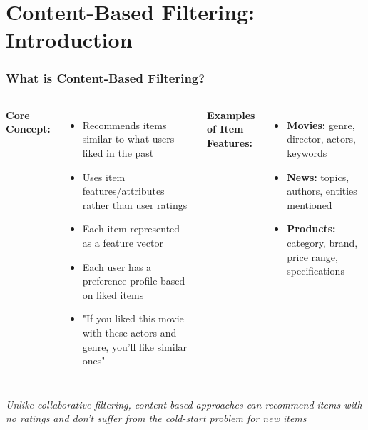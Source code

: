 \documentclass{beamer}
\begin{document}
\section{Content-Based Filtering: Introduction}
\begin{frame}
\frametitle{What is Content-Based Filtering?}

\begin{columns}
\textbf{Core Concept:}
\begin{itemize}
    \item Recommends items similar to what users liked in the past
    \item Uses item features/attributes rather than user ratings
    \item Each item represented as a feature vector
    \item Each user has a preference profile based on liked items
    \item "If you liked this movie with these actors and genre, you'll like similar ones"
\end{itemize}

\textbf{Examples of Item Features:}
\begin{itemize}
    \item \textbf{Movies:} genre, director, actors, keywords
    \item \textbf{News:} topics, authors, entities mentioned
    \item \textbf{Products:} category, brand, price range, specifications
\end{itemize}
\end{columns}

\vspace{0.5cm}
\begin{center}
\textit{Unlike collaborative filtering, content-based approaches can recommend items with no ratings and don't suffer from the cold-start problem for new items}
\end{center}
\end{frame}
\end{document}
